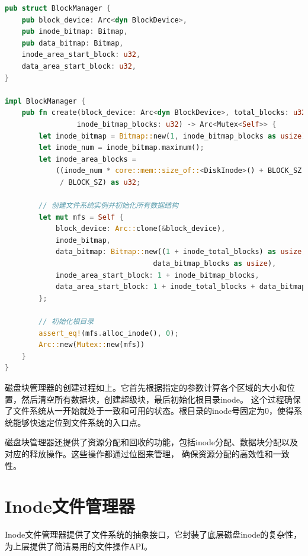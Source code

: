 \begin{lstlisting}[language=Rust]
pub struct BlockManager {
    pub block_device: Arc<dyn BlockDevice>,
    pub inode_bitmap: Bitmap,
    pub data_bitmap: Bitmap,
    inode_area_start_block: u32,
    data_area_start_block: u32,
}

impl BlockManager {
    pub fn create(block_device: Arc<dyn BlockDevice>, total_blocks: u32,
                 inode_bitmap_blocks: u32) -> Arc<Mutex<Self>> {
        let inode_bitmap = Bitmap::new(1, inode_bitmap_blocks as usize);
        let inode_num = inode_bitmap.maximum();
        let inode_area_blocks = 
            ((inode_num * core::mem::size_of::<DiskInode>() + BLOCK_SZ - 1) 
             / BLOCK_SZ) as u32;
        
        // 创建文件系统实例并初始化所有数据结构
        let mut mfs = Self {
            block_device: Arc::clone(&block_device),
            inode_bitmap,
            data_bitmap: Bitmap::new((1 + inode_total_blocks) as usize,
                                   data_bitmap_blocks as usize),
            inode_area_start_block: 1 + inode_bitmap_blocks,
            data_area_start_block: 1 + inode_total_blocks + data_bitmap_blocks,
        };
        
        // 初始化根目录
        assert_eq!(mfs.alloc_inode(), 0);
        Arc::new(Mutex::new(mfs))
    }
}
\end{lstlisting}

磁盘块管理器的创建过程如上。它首先根据指定的参数计算各个区域的大小和位置，然后清空所有数据块，创建超级块，最后初始化根目录inode。
这个过程确保了文件系统从一开始就处于一致和可用的状态。根目录的inode号固定为0，使得系统能够快速定位到文件系统的入口点。

磁盘块管理器还提供了资源分配和回收的功能，包括inode分配、数据块分配以及对应的释放操作。这些操作都通过位图来管理，
确保资源分配的高效性和一致性。

\section{Inode文件管理器}

Inode文件管理器提供了文件系统的抽象接口，它封装了底层磁盘inode的复杂性，为上层提供了简洁易用的文件操作API。

